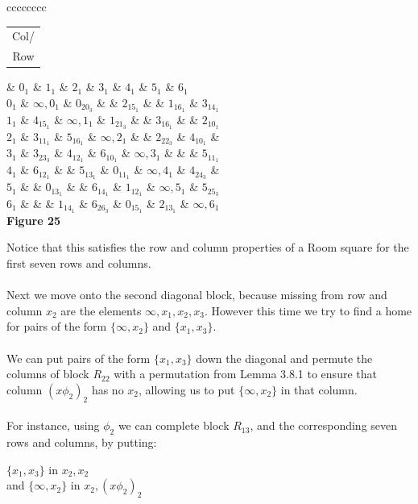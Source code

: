 \documentclass[
  12pt,
  a4paper]{book}
\begin{document}
{\textbar c\textbar c\textbar c\textbar c\textbar c\textbar c\textbar c\textbar c\textbar{}}

\begin{longtable}[]{@{}c@{}}
\toprule
\endhead
Col/\tabularnewline
Row\tabularnewline
\bottomrule
\end{longtable}

\& \(0_1\) \& \(1_1\) \& \(2_1\) \& \(3_1\) \& \(4_1\) \& \(5_1\) \&
\(6_1\)\\
\(0_1\) \& \(\infty,0_1\) \& \(0_20_3\) \& \& \(2_15_1\) \& \&
\(1_16_1\) \& \(3_14_1\)\\
\(1_1\) \& \(4_15_1\) \& \(\infty, 1_1\) \& \(1_21_3\) \& \& \(3_16_1\)
\& \& \(2_10_1\)\\
\(2_1\) \& \(3_11_1\) \& \(5_16_1\) \& \(\infty,2_1\) \& \& \(2_22_3\)
\& \(4_10_1\) \&\\
\(3_1\) \& \(3_23_3\) \& \(4_12_1\) \& \(6_10_1\) \& \(\infty,3_1\) \&
\& \& \(5_11_1\)\\
\(4_1\) \& \(6_12_1\) \& \& \(5_13_1\) \& \(0_11_1\) \& \(\infty,4_1\)
\& \(4_24_3\) \&\\
\(5_1\) \& \& \(0_13_1\) \& \& \(6_14_1\) \& \(1_12_1\) \&
\(\infty,5_1\) \& \(5_25_3\)\\
\(6_1\) \& \& \& \(1_14_1\) \& \(6_26_3\) \& \(0_15_1\) \& \(2_13_1\) \&
\(\infty,6_1\)\\

\textbf{Figure 25}

Notice that this satisfies the row and column properties of a Room
square for the first seven rows and columns.\\
~\\
Next we move onto the second diagonal block, because missing from row
and column \(x_2\) are the elements \(\infty, x_1,x_2,x_3\). However
this time we try to find a home for pairs of the form \(\{\infty,x_2\}\)
and \(\{x_1,x_3\}\).\\
~\\
We can put pairs of the form \(\{x_1,x_3\}\) down the diagonal and
permute the columns of block \(R_{22}\) with a permutation from Lemma
3.8.1 to ensure that column \((x\phi _2)_2\) has no \(x_2\), allowing us
to put \(\{\infty,x_2\}\) in that column.\\
~\\
For instance, using \(\phi _2\) we can complete block \(R_{13}\), and
the corresponding seven rows and columns, by putting:

\(\{x_1,x_3\}\) in \(x_2,x_2\)\\
and \(\{\infty,x_2\}\) in \(x_2,(x \phi _2)_2\)\\
\end{document}
